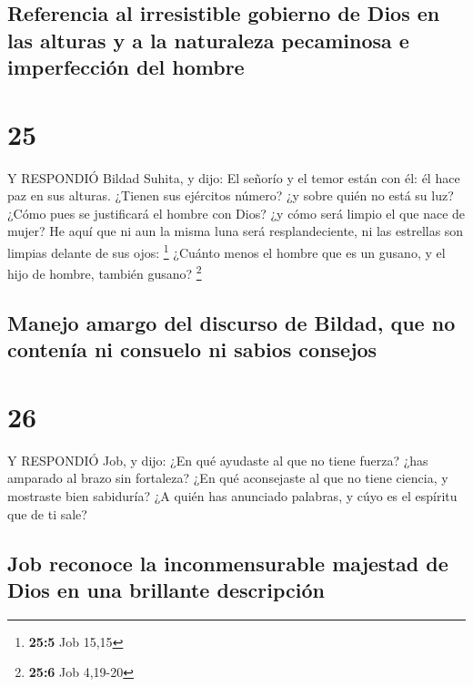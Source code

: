 \hypertarget{referencia-al-irresistible-gobierno-de-dios-en-las-alturas-y-a-la-naturaleza-pecaminosa-e-imperfecciuxf3n-del-hombre}{%
\subsection{Referencia al irresistible gobierno de Dios en las alturas y
a la naturaleza pecaminosa e imperfección del
hombre}\label{referencia-al-irresistible-gobierno-de-dios-en-las-alturas-y-a-la-naturaleza-pecaminosa-e-imperfecciuxf3n-del-hombre}}

\hypertarget{section-24}{%
\section{25}\label{section-24}}

 Y RESPONDIÓ Bildad Suhita, y dijo:  El señorío
y el temor están con él: él hace paz en sus alturas. 
¿Tienen sus ejércitos número? ¿y sobre quién no está su luz?
 ¿Cómo pues se justificará el hombre con Dios? ¿y cómo será
limpio el que nace de mujer?  He aquí que ni aun la misma
luna será resplandeciente, ni las estrellas son limpias delante de sus
ojos: \footnote{\textbf{25:5} Job 15,15}  ¿Cuánto menos el
hombre que es un gusano, y el hijo de hombre, también gusano?
\footnote{\textbf{25:6} Job 4,19-20}

\hypertarget{manejo-amargo-del-discurso-de-bildad-que-no-contenuxeda-ni-consuelo-ni-sabios-consejos}{%
\subsection{Manejo amargo del discurso de Bildad, que no contenía ni
consuelo ni sabios
consejos}\label{manejo-amargo-del-discurso-de-bildad-que-no-contenuxeda-ni-consuelo-ni-sabios-consejos}}

\hypertarget{section-25}{%
\section{26}\label{section-25}}

 Y RESPONDIÓ Job, y dijo:  ¿En qué ayudaste al
que no tiene fuerza? ¿has amparado al brazo sin fortaleza? 
¿En qué aconsejaste al que no tiene ciencia, y mostraste bien sabiduría?
 ¿A quién has anunciado palabras, y cúyo es el espíritu que
de ti sale?

\hypertarget{job-reconoce-la-inconmensurable-majestad-de-dios-en-una-brillante-descripciuxf3n}{%
\subsection{Job reconoce la inconmensurable majestad de Dios en una
brillante
descripción}\label{job-reconoce-la-inconmensurable-majestad-de-dios-en-una-brillante-descripciuxf3n}}

